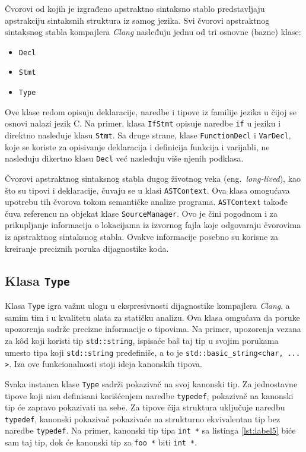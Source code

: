 \documentclass[12pt,oneside]{memoir}
\begin{document}
\v{C}vorovi od kojih je izgrađeno apstraktno sintaksno stablo predstavljaju apstrakciju sintaksnih struktura iz samog jezika.
Svi \v{c}vorovi apstraktnog sintaksnog stabla kompajlera \textit{Clang} nasleđuju jednu od tri osnovne (bazne) klase:
\begin{itemize}
  \item \texttt{Decl}
  \item \texttt{Stmt}
  \item \texttt{Type}
\end{itemize}
Ove klase redom opisuju deklaracije, naredbe i tipove iz familije jezika u \v{c}ijoj se osnovi nalazi jezik C.
Na primer, klasa \texttt{IfStmt} opisuje naredbe \texttt{if} u jeziku i direktno nasleđuje klasu \texttt{Stmt}. Sa druge strane, klase \texttt{FunctionDecl} i \texttt{VarDecl}, koje se koriste za opisivanje deklaracija i definicija funkcija i varijabli, ne nasleđuju dikertno klasu \texttt{Decl} ve\'{c} nasleđuju vi\v{s}e njenih podklasa.
\par
\v{C}vorovi apstraktnog sintaksnog stabla dugog \v{z}ivotnog veka (eng.~\textit{long-lived}), kao \v{s}to su tipovi i deklaracije, \v{c}uvaju se u klasi \texttt{ASTContext}. Ova klasa
omogu\'{c}ava upotrebu tih \v{c}vorova tokom semanti\v{c}ke analize programa. \texttt{ASTContext} takođe \v{c}uva referencu na objekat klase \texttt{SourceManager}. Ovo je
\v{c}ini pogodnom i za prikupljanje informacija o lokacijama iz izvornog fajla koje odgovaraju \v{c}vorovima iz apstraktnog sintaksnog stabla. Ovakve informacije posebno su korisne za kreiranje
preciznih poruka dijagnostike koda.

\subsection{Klasa \texttt{Type}}
  Klasa \texttt{Type} igra va\v{z}nu ulogu u ekspresivnosti dijagnostike kompajlera \textit{Clang}, a samim tim i u kvalitetu alata za stati\v{c}ku analizu. Ova klasa omgu\'{c}ava da poruke upozorenja sadr\v{z}e precizne informacije o tipovima. Na primer, upozorenja vezana za k\^{o}d koji koristi tip \texttt{std::string}, ispisa\'{c}e ba\v{s} taj tip u svojim porukama umesto tipa koji \texttt{std::string} predefini\v{s}e, a to je \texttt{std::basic\_string<char, ... >}. Iza ove funkcionalnosti stoji ideja kanonskih tipova.
  
  \par
  Svaka instanca klase \texttt{Type} sadr\v{z}i pokaziva\v{c} na svoj kanonski tip. Za jednostavne tipove koji nisu definisani kori\v{s}\'{c}enjem naredbe \texttt{typedef}, pokaziva\v{c} na kanonski tip \'{c}e zapravo pokazivati na sebe. Za tipove \v{c}ija struktura uklju\v{c}uje naredbu \texttt{typedef}, kanonski pokaziva\v{c} pokaziva\'{c}e na strukturno ekvivalentan tip bez naredbe \texttt{typedef}.
  Na primer, kanonski tip tipa \texttt{int *} sa listinga \ref{lst:label5}  bi\'{c}e sam taj tip, dok \'{c}e kanonski tip za \texttt{foo *} biti \texttt{int *}.
\end{document}
